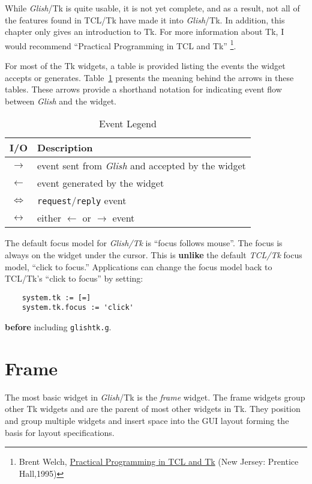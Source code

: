 While {\em Glish}/Tk is quite usable, it is not yet complete, 
and as a result, not
all of the features found in TCL/Tk have made it into {\em Glish}/Tk. In addition,
this chapter only gives an introduction to Tk. For more information about
Tk, I would recommend ``Practical Programming in TCL and Tk''
\footnote{Brent Welch, \underline{Practical Programming in TCL and Tk} (New Jersey: Prentice Hall,1995)}.

For most of the Tk widgets, a table is provided listing the events
the widget accepts or generates. Table~\ref{tkevent-legend} presents
the meaning behind the arrows in these tables. These arrows provide a
shorthand notation for indicating event flow between {\em Glish} and 
the widget.

\begin{table}[tbh]
{\small
\begin{center}
\begin{tabular}{|c|p{3.1in}|}
\hline
 I/O & Description \\
\hline
\hline
$\rightarrow$& event sent from {\em Glish} and accepted by the widget \\ \hline
$\leftarrow$& event generated by the widget \\ \hline
$\Leftrightarrow$& {\tt request}/{\tt reply} event \\ \hline
$\leftrightarrow$& either $\leftarrow$ or $\rightarrow$ event\\ \hline
\end{tabular}
\end{center}
}
\caption{ Event Legend }
\label{tkevent-legend}
\end{table}

The default focus model for {\em Glish/Tk} is ``focus follows mouse''. The
focus is always on the widget under the cursor. This is {\bf unlike} the
default {\em TCL/Tk} focus model, ``click to focus.'' Applications
can change the focus model back to TCL/Tk's ``click to focus'' by setting:
\begin{verbatim}
    system.tk := [=]
    system.tk.focus := 'click'
\end{verbatim}
{\bf before} including {\tt glishtk.g}.

\section{Frame}
The most basic widget in {\em Glish}/Tk is the {\em frame} widget. 
The frame widgets  group other Tk widgets and are the parent of most
other widgets in Tk.  They position and group multiple
widgets and insert space into the GUI layout forming the basis for layout
specifications.

